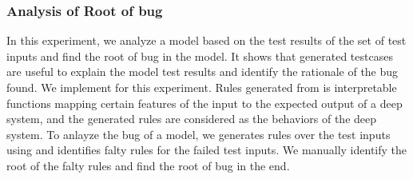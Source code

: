 \subsubsection*{\textbf{Analysis of Root of bug}}
In this experiment, we analyze a \sa model based on the test results
of the set of \tool test inputs and find the root of bug in the
model. It shows that \tool generated testcases are useful to explain
the \sa model test results and identify the rationale of the bug
found. We implement \Denas for this experiment. Rules generated from
\Denas is interpretable functions mapping certain features of the
input to the expected output of a deep \nn system, and the generated
rules are considered as the behaviors of the deep \nn system. To
anlayze the bug of a \sa model, we generates rules over the test
inputs using \Denas and identifies falty rules for the failed test
inputs. We manually identify the root of the falty rules and find the
root of bug in the end.




